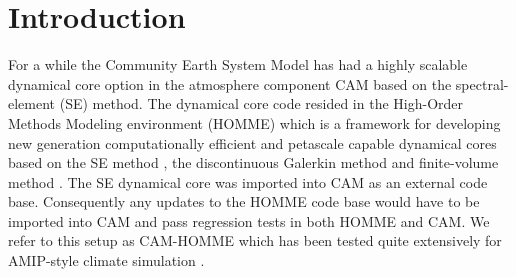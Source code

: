 \documentclass{agujournal}
\begin{document}
%
%

% 


%
% 
% 
% 


\section{Introduction}
For a while the Community Earth System Model \citep[CESM; ][]{CESM1} has had a highly scalable dynamical core option in the atmosphere component CAM \citep[Community Atmosphere Model; ][]{CAM5} based on the spectral-element (SE) method. The dynamical core code resided in the High-Order Methods Modeling environment (HOMME) which is a framework for developing new generation computationally efficient and petascale capable dynamical cores based on the SE method \citep{TL2000JSC,TES2008JPCS}, the discontinuous Galerkin method \citep{NCT2009CF} and finite-volume method \citep{ELGT2012PCS,LTOUNGK2017MWR}. The SE dynamical core was imported into CAM as an external code base. Consequently any updates to the HOMME code base would have to be imported into CAM and pass regression tests in both HOMME and CAM. We refer to this setup as CAM-HOMME which has been tested quite extensively for AMIP-style climate simulation \citep{ELMNTT2012JC}.{\color{red}{mention cubed-sphere and mesh-refinement}}
\end{document}
